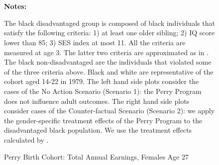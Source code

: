 \begin{figure} \begin{center}\centering
        \caption{Perry Birth Cohort: Total Annual Earnings, Females Age 27}
        \label{female_earn_decile1}\vspace{0.2cm}        
          \\
          \\
\end{center}
{\scriptsize {\bfseries Notes: } \raggedright The black disadvantaged group is composed of black individuals that satisfy the following criteria: 1) at least one older sibling; 2) IQ score lower than 85; 3) SES index at most 11. All the criteria are measured at age 3. The latter two criteria are approximated as in \citet{heckman2010analyzing}. The black non-disadvantaged are the individuals that violated some of the three criteria above. Black and white are representative of the cohort aged 14-22 in 1979. The left hand side plots consider the cases of the No Action Scenario (Scenario 1): the Perry Program does not influence adult outcomes. The right hand side plots consider cases of the Counter-factual Scenario (Scenario 2): we apply the gender-specific treatment effects of the Perry Program to the disadvantaged black population. We use the treatment effects calculated by \citet{heckman2010analyzing}. 
}
\end{figure}


